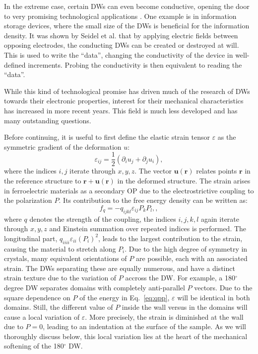 In the extreme case, certain DWs can even become conductive, opening the door to very promising technological applications \cite{Seidel2009}.
One example is in information storage devices, where the small size of the DWs is beneficial for the information density.
It was shown by Seidel et al. that by applying electric fields between opposing electrodes, the conducting DWs can be created or destroyed at will. This is used to write the ``data'', changing  the conductivity of the device in well-defined increments.
Probing the conductivity is then equivalent to reading the ``data''. 

While this kind of technological promise has driven much of the research of DWs towards their electronic properties, interest for their mechanical characteristics has increased in more recent years.
This field is much less developed and has many outstanding questions.

Before continuing, it is useful to first define the elastic strain tensor $\varepsilon$ as the symmetric gradient of the deformation $u$:
\begin{equation}
\varepsilon_{ij} = \frac{1}{2}(\partial_i u_j + \partial_j u_i),
\end{equation}
where the indices $i,j$ iterate through $x, y, z$.
The vector $\bm{u}(\bm{r})$ relates points $\bm{r}$ in the reference structure to $\bm{r} + \bm{u}(\bm{r})$ in the deformed structure.
The strain arises in ferroelectric materials as a secondary OP due to the electrostrictive coupling to the polarization $P$.
Its contribution to the free energy density can be written as:
\begin{equation}
	f_{q}=-q_{ijkl}\varepsilon_{ij}P_{k}P_{l},\label{eq:qpp},
\end{equation}
where $q$ denotes the strength of the coupling, the indices $i, j, k, l$ again iterate through $x, y, z$ and Einstein summation over repeated indices is performed.
The longitudinal part, $q_{iiii} \varepsilon_{ii} (P_i)^2$, leads to the largest contribution to the strain, causing the material to stretch along $P_i$.
Due to the high degree of symmetry in crystals, many equivalent orientations of $P$ are possible, each with an associated strain. The DWs separating these are equally numerous, and have a distinct strain texture due to the variation of $P$ accross the DW.
For example, a 180$^\circ$ degree DW separates domains with completely anti-parallel $P$ vectors.
Due to the square dependence on $P$ of the energy in Eq.~\ref{eq:qpp}, $\varepsilon$ will be identical in both domains. Still, the different value of $P$ inside the wall versus in the domains will cause a local variation of $\varepsilon$. More precisely, the strain is diminished at the wall due to $P=0$, leading to an indentation at the surface of the sample.
As we will thoroughly discuss below, this local variation lies at the heart of the mechanical softening of the 180$^\circ$ DW.

